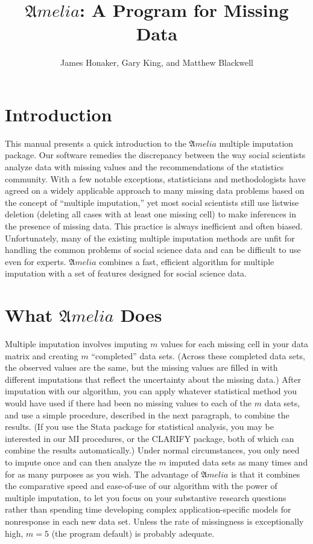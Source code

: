 \documentclass[12pt,titlepage]{article}
\title{${\mathfrak Amelia}$: A Program for Missing Data}
\author{James Honaker, Gary King, and Matthew Blackwell}
\begin{document}
\maketitle


\tableofcontents
\newpage

\section{Introduction}
\label{sec:intro}

This manual presents a quick introduction to the ${\mathfrak Amelia}$ multiple imputation package.  Our software remedies the discrepancy between the way social scientists analyze data with missing values and the recommendations of the statistics community. With a few notable exceptions, statisticians and methodologists have agreed on a widely applicable approach to many missing data problems based on the concept of ``multiple imputation,'' yet most social scientists still use listwise deletion (deleting all cases with at least one missing cell) to make inferences in the presence of missing data. This practice is always inefficient and often biased. Unfortunately, many of the existing multiple imputation methods are unfit for handling the common problems of social science data and can be difficult to use even for experts.  ${\mathfrak Amelia}$ combines a fast, efficient algorithm for multiple imputation with a set of features designed for social science data.        

\section{What ${\mathfrak Amelia}$ Does}
\label{sec:what}
Multiple imputation involves imputing $m$ values for each missing cell in your data matrix and creating $m$ ``completed'' data sets.  (Across these completed data sets, the observed values are the same, but the missing values are filled in with different imputations that reflect the uncertainty about the missing data.)  After imputation with our algorithm, you can apply whatever statistical method you would have used if there had been no missing values to each of the $m$ data sets, and use a simple procedure, described in the next paragraph, to combine the results.  (If you use the Stata package for statistical analysis, you may be interested in our MI procedures, or the CLARIFY package, both of which can combine the results automatically.)  Under normal circumstances, you only need to impute once and can then analyze the $m$ imputed data sets as many times and for as many purposes as you wish.  The advantage of ${\mathfrak Amelia}$ is that it combines the comparative speed and ease-of-use of our algorithm with the power of multiple imputation, to let you focus on your substantive research questions rather than spending time developing complex application-specific models for nonresponse in each new data set.  Unless the rate of missingness is exceptionally high, $m = 5$ (the program default) is probably adequate.
\end{document}
